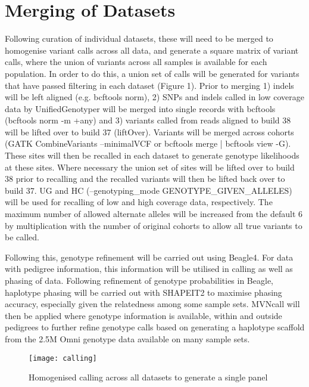 \section{Merging of Datasets}

Following curation of individual datasets, these will need to be merged to homogenise variant calls across all data, and generate a square matrix of variant calls, where the union of variants across all samples is available for each population. In order to do this, a union set of calls will be generated for variants that have passed filtering in each dataset (Figure 1). Prior to merging 1) indels will be left aligned (e.g. bcftools norm), 2) SNPs and indels called in low coverage data by UnifiedGenotyper will be merged into single records with bcftools (bcftools norm -m +any) and 3) variants called from reads aligned to build 38 will be lifted over to build 37 (liftOver). %
Variants will be merged across cohorts (GATK CombineVariants --minimalVCF or bcftools merge | bcftools view -G). These sites will then be recalled in each dataset to generate genotype likelihoods at these sites. Where necessary the union set of sites will be lifted over to build 38 prior to recalling and the recalled variants will then be lifted back over to build 37. UG and HC (--genotyping\_mode GENOTYPE\_GIVEN\_ALLELES) will be used for recalling of low and high coverage data, respectively. The maximum number of allowed alternate alleles will be increased from the default 6 by multiplication with the number of original cohorts to allow all true variants to be called.

Following this, genotype refinement will be carried out using Beagle4. For data with pedigree information, this information will be utilised in calling as well as phasing of data. Following refinement of genotype probabilities in Beagle, haplotype phasing will be carried out with SHAPEIT2 to maximise phasing accuracy, especially given the relatedness among some sample sets. MVNcall\cite{Menelaou2013} will then be applied where genotype information is available, within and outside pedigrees to further refine genotype calls based on generating a haplotype scaffold from the 2.5M Omni genotype data available on many sample sets.

\begin{figure}[h]
\caption{Homogenised calling across all datasets to generate a single panel}
\centering
\texttt{[image: calling]}
\end{figure}
